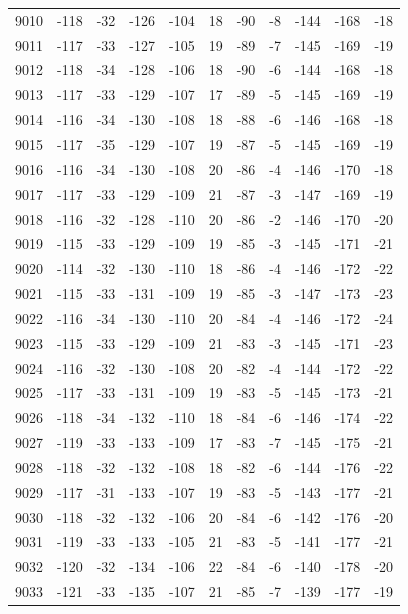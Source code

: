 \begin{table}[H]
\begin{tabular}{lllllllllll}
9010 & -118 & -32 & -126 & -104 & 18 & -90 & -8 & -144 & -168 & -18 \\
9011 & -117 & -33 & -127 & -105 & 19 & -89 & -7 & -145 & -169 & -19 \\
9012 & -118 & -34 & -128 & -106 & 18 & -90 & -6 & -144 & -168 & -18 \\
9013 & -117 & -33 & -129 & -107 & 17 & -89 & -5 & -145 & -169 & -19 \\
9014 & -116 & -34 & -130 & -108 & 18 & -88 & -6 & -146 & -168 & -18 \\
9015 & -117 & -35 & -129 & -107 & 19 & -87 & -5 & -145 & -169 & -19 \\
9016 & -116 & -34 & -130 & -108 & 20 & -86 & -4 & -146 & -170 & -18 \\
9017 & -117 & -33 & -129 & -109 & 21 & -87 & -3 & -147 & -169 & -19 \\
9018 & -116 & -32 & -128 & -110 & 20 & -86 & -2 & -146 & -170 & -20 \\
9019 & -115 & -33 & -129 & -109 & 19 & -85 & -3 & -145 & -171 & -21 \\
9020 & -114 & -32 & -130 & -110 & 18 & -86 & -4 & -146 & -172 & -22 \\
9021 & -115 & -33 & -131 & -109 & 19 & -85 & -3 & -147 & -173 & -23 \\
9022 & -116 & -34 & -130 & -110 & 20 & -84 & -4 & -146 & -172 & -24 \\
9023 & -115 & -33 & -129 & -109 & 21 & -83 & -3 & -145 & -171 & -23 \\
9024 & -116 & -32 & -130 & -108 & 20 & -82 & -4 & -144 & -172 & -22 \\
9025 & -117 & -33 & -131 & -109 & 19 & -83 & -5 & -145 & -173 & -21 \\
9026 & -118 & -34 & -132 & -110 & 18 & -84 & -6 & -146 & -174 & -22 \\
9027 & -119 & -33 & -133 & -109 & 17 & -83 & -7 & -145 & -175 & -21 \\
9028 & -118 & -32 & -132 & -108 & 18 & -82 & -6 & -144 & -176 & -22 \\
9029 & -117 & -31 & -133 & -107 & 19 & -83 & -5 & -143 & -177 & -21 \\
9030 & -118 & -32 & -132 & -106 & 20 & -84 & -6 & -142 & -176 & -20 \\
9031 & -119 & -33 & -133 & -105 & 21 & -83 & -5 & -141 & -177 & -21 \\
9032 & -120 & -32 & -134 & -106 & 22 & -84 & -6 & -140 & -178 & -20 \\
9033 & -121 & -33 & -135 & -107 & 21 & -85 & -7 & -139 & -177 & -19 \\

\end{tabular}
\end{table}
